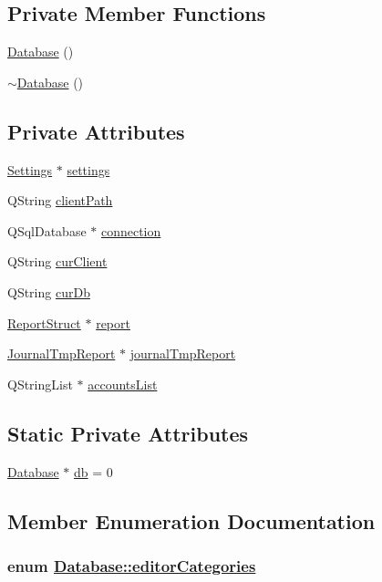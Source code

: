 \subsection*{Private Member Functions}
\begin{CompactItemize}
\item 
\hyperlink{classDatabase_d0}{Database} ()
\item 
\hyperlink{classDatabase_d1}{$\sim$Database} ()
\end{CompactItemize}
\subsection*{Private Attributes}
\begin{CompactItemize}
\item 
\hyperlink{classSettings}{Settings} $\ast$ \hyperlink{classDatabase_r0}{settings}
\item 
QString \hyperlink{classDatabase_r1}{client\-Path}
\item 
QSql\-Database $\ast$ \hyperlink{classDatabase_r2}{connection}
\item 
QString \hyperlink{classDatabase_r3}{cur\-Client}
\item 
QString \hyperlink{classDatabase_r4}{cur\-Db}
\item 
\hyperlink{structDatabase_1_1ReportStruct}{Report\-Struct} $\ast$ \hyperlink{classDatabase_r5}{report}
\item 
\hyperlink{structDatabase_1_1JournalTmpReport}{Journal\-Tmp\-Report} $\ast$ \hyperlink{classDatabase_r6}{journal\-Tmp\-Report}
\item 
QString\-List $\ast$ \hyperlink{classDatabase_r7}{accounts\-List}
\end{CompactItemize}
\subsection*{Static Private Attributes}
\begin{CompactItemize}
\item 
\hyperlink{classDatabase}{Database} $\ast$ \hyperlink{classDatabase_v0}{db} = 0
\end{CompactItemize}


\subsection{Member Enumeration Documentation}
\hypertarget{classDatabase_w8}{
\subsubsection[editorCategories]{\setlength{\rightskip}{0pt plus 5cm}enum \hyperlink{classDatabase_w8}{Database::editor\-Categories}}}
\label{classDatabase_w8}


